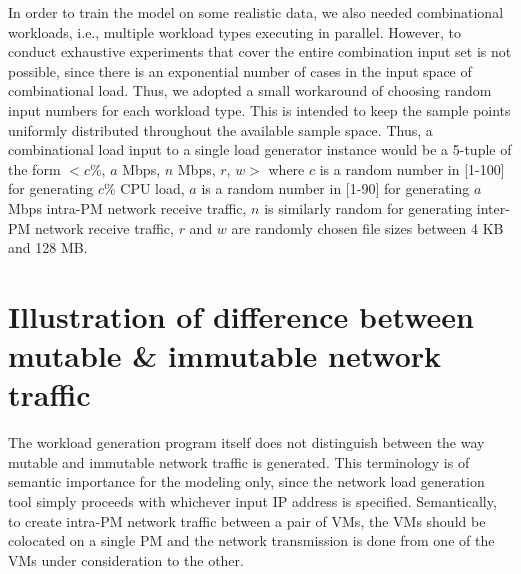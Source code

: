 In order to train the model on some realistic data, we also needed combinational workloads,
i.e., multiple workload types executing in parallel. However, to conduct exhaustive experiments
that cover the entire combination input set is not possible, since there is an exponential number
of cases in the input space of combinational load. Thus, we adopted a small workaround of
choosing random input numbers for each workload type. This is intended to keep the sample
points uniformly distributed throughout the available sample space. Thus, a combinational load
input to a single load generator instance would be a 5-tuple of the form $<c$\%, $a$ Mbps, $n$ Mbps,
$r$, $w>$ where $c$ is a random number in [1-100] for generating $c$\% CPU load, $a$ is a random number
in [1-90] for generating $a$ Mbps intra-PM network receive traffic, $n$ is similarly random for generating
inter-PM network receive traffic, $r$ and $w$ are randomly chosen file sizes between 4 KB and 128 MB.

\section{Illustration of difference between mutable \& immutable network traffic}
The workload generation program itself
does not distinguish between the way mutable and 
immutable
network traffic is generated. This terminology
is of semantic importance for the modeling only, 
since the network load generation tool simply
proceeds with whichever input IP address is specified. 
Semantically, to create intra-PM network traffic between a pair of VMs, 
the VMs should be colocated on a single PM and 
the network transmission
is done from one of the VMs under consideration
to the other. 


